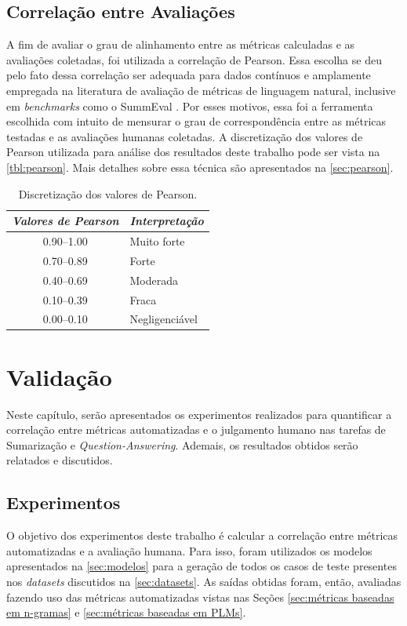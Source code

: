 \documentclass[cic,tc]{iiufrgs}
\begin{document}
\section{Correlação entre Avaliações}
\label{sec:pearson-metodologia}
A fim de avaliar o grau de alinhamento entre as métricas calculadas e as avaliações coletadas, foi utilizada a correlação de Pearson. Essa escolha se deu pelo fato dessa correlação ser adequada para dados contínuos e amplamente empregada na literatura de avaliação de métricas de linguagem natural, inclusive em \textit{benchmarks} como o SummEval \cite{fabbri2021summeval}. Por esses motivos, essa foi a ferramenta escolhida com intuito de mensurar o grau de correspondência entre as métricas testadas e as avaliações humanas coletadas. A discretização dos valores de Pearson utilizada para análise dos resultados deste trabalho pode ser vista na \autoref{tbl:pearson}. Mais detalhes sobre essa técnica são apresentados na \autoref{sec:pearson}.

\begin{table}[htbp]
    \caption{Discretização dos valores de Pearson.}
    \centering
        \begin{tabular}{c l}
          \hline
          \textit{Valores de Pearson} & \textit{Interpretação} \\
          \hline
          \hline
          0.90–1.00 & Muito forte    \\
          0.70–0.89 & Forte          \\
          0.40–0.69 & Moderada       \\
          0.10–0.39 & Fraca          \\
          0.00–0.10 & Negligenciável \\
          \hline
        \end{tabular}
    \label{tbl:pearson}
\end{table}

\chapter{Validação}
Neste capítulo, serão apresentados os experimentos realizados para quantificar a correlação entre métricas automatizadas e o julgamento humano nas tarefas de Sumarização e \textit{Question-Answering}. Ademais, os resultados obtidos serão relatados e discutidos.

\label{cap:validação}
\section{Experimentos}
O objetivo dos experimentos deste trabalho é calcular a correlação entre métricas automatizadas e a avaliação humana. Para isso, foram utilizados os modelos apresentados na \autoref{sec:modelos} para a geração de todos os casos de teste presentes nos \textit{datasets} discutidos na \autoref{sec:datasets}. As saídas obtidas foram, então, avaliadas fazendo uso das métricas automatizadas vistas nas Seções \ref{sec:métricas baseadas em n-gramas} e \ref{sec:métricas baseadas em PLMs}. 
\end{document}
